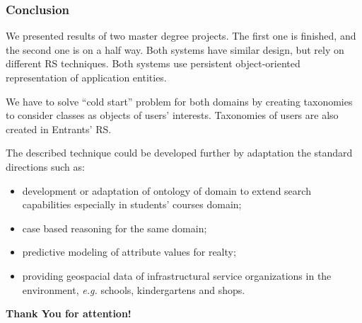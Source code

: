 \documentclass[10pt,dvipsnames]{beamer}
\begin{document}
\begin{frame}
  \frametitle{Conclusion}
  We presented results of two master degree projects.  The first one is finished, and the second one is on a half way.  Both systems have similar design, but rely on different RS techniques. Both systems use persistent object-oriented representation of application entities.

We have to solve ``cold start'' problem for both domains by creating taxonomies to consider classes as objects of users' interests.  Taxonomies of users are also created in Entrants' RS.

The described technique could be developed further by adaptation the standard directions such as:
\begin{itemize}
  \item development or adaptation of ontology of domain to extend search capabilities especially in students' courses domain;
  \item case based reasoning for the same domain;
  \item predictive modeling of attribute values for realty;
  \item providing geospacial data of infrastructural service organizations in the environment, \emph{e.g.} schools, kindergartens and shops.
\end{itemize}
\end{frame}

\begin{frame}{}
  \vfill
  \centering
  \Huge \textbf{Thank You for attention!}
  \vfill
\end{frame}
\end{document}
